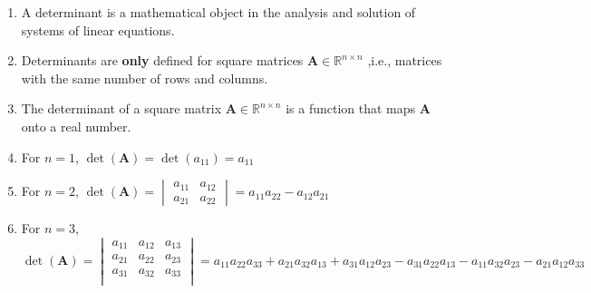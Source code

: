 \begin{enumerate}
    \item 
    \begin{definition}[Determinant]
        A determinant is a mathematical object in the analysis and solution of systems of linear equations.
        \hfill \cite{mfml/book/mml/Deisenroth-Faisal-Ong}
    \end{definition}

    \item Determinants are \textbf{only} defined for square matrices $\bm{A} \in \mathbb{R}^{n\times n}$ ,i.e., matrices with the same number of rows and columns.
    \hfill \cite{mfml/book/mml/Deisenroth-Faisal-Ong}

    \item The determinant of a square matrix $\bm{A} \in \mathbb{R}^{n\times n}$ is a function that maps $\bm{A}$ onto a real number.
    \hfill \cite{mfml/book/mml/Deisenroth-Faisal-Ong}

    \item For $n=1$, $\det(\bm{A}) = \det(a_{11}) = a_{11}$
    \hfill \cite{mfml/book/mml/Deisenroth-Faisal-Ong}

    \item For $n=2$, 
    $
        \det(\bm{A}) 
        = \begin{vmatrix}
            a_{11} & a_{12} \\
            a_{21} & a_{22}
        \end{vmatrix} 
        = a_{11} a_{22} - a_{12} a_{21}
    $
    \hfill \cite{mfml/book/mml/Deisenroth-Faisal-Ong}

    \item  
    \begin{definition}
        For $n=3$, 
        \hfill \cite{mfml/book/mml/Deisenroth-Faisal-Ong}
        \\[0.3cm]
        $
            \det(\bm{A}) 
            = \begin{vmatrix}
                a_{11} & a_{12} & a_{13} \\
                a_{21} & a_{22} & a_{23} \\
                a_{31} & a_{32} & a_{33} \\
            \end{vmatrix} 
            = a_{11} a_{22} a_{33}  + a_{21} a_{32} a_{13}  + a_{31} a_{12} a_{23}  - a_{31} a_{22} a_{13}  - a_{11} a_{32} a_{23}  - a_{21} a_{12} a_{33} 
        $
        \hfill \cite{mfml/book/mml/Deisenroth-Faisal-Ong}
    \end{definition}


\end{enumerate}
